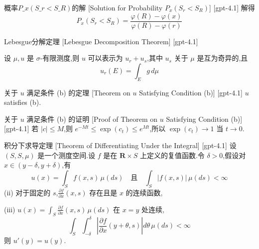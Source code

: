 \documentclass[UTF8]{ctexart}
\begin{document}
    
    
    \begin{ppt}
        {概率$P\_{x}(S\_{r} < S\_{R})$的解}
        [Solution for Probability $P_{x}(S_{r} < S_{R})$]
        [gpt-4.1]
        解得
\[
P_{x}(S_{r} < S_{R}) = \frac{\varphi(R) - \varphi(x)}{\varphi(R) - \varphi(r)}
\]

    \end{ppt}
    
    
    
    \begin{thm}
        {Lebesgue分解定理}
        [Lebesgue Decomposition Theorem]
        [gpt-4.1]
        
设 $\mu, 
u$ 是 $\sigma$-有限测度,则 $
u$ 可以表示为 $
u_{r} + 
u_{s}$,其中 $
u_{s}$ 关于 $\mu$ 是互为奇异的,且
\[
u_{r}(E) = \int_{E} g \, d\mu
\]

    \end{thm}
    
    
    
    \begin{thm}
        {关于 $
    u$ 满足条件 (b) 的定理}
        [Theorem on $
    u$ Satisfying Condition (b)]
        [gpt-4.1]
        $
u$ satisfies (b).
    \end{thm}
    
    
    
    \begin{prf}
        {关于 $
    u$ 满足条件 (b) 的证明}
        [Proof of Theorem on $
    u$ Satisfying Condition (b)]
        [gpt-4.1]
        若 $| c | \leq M$,则 $e^{ - M t } \leq \exp ( c _ { t } ) \leq e^{ M t }$,所以 $\exp ( c _ { t } ) \to 1$ 当 $t \to 0$.
    \end{prf}
    
    
    
    \begin{thm}
        {积分下求导定理}
        [Theorem of Differentiating Under the Integral]
        [gpt-4.1]
        设 $(S, S, \mu)$ 是一个测度空间.设 $f$ 是在 $\mathbf{R} \times S$ 上定义的复值函数.令 $\delta > 0$,假设对 $x \in (y - \delta, y + \delta)$,有
\[
u(x) = \int_{S} f(x, s)\, \mu(ds) \quad \text{且} \quad \int_{S} |f(x, s)|\, \mu(ds) < \infty
\]
(ii) 对于固定的 $s$,$\frac{\partial f}{\partial x}(x, s)$ 存在且是 $x$ 的连续函数,

(iii) $
u(x) = \int_{S} \frac{\partial f}{\partial x}(x, s)\, \mu(ds)$ 在 $x = y$ 处连续,
\[
\int_{S} \int_{-\delta}^{\delta} \left| \frac{\partial f}{\partial x}(y + \theta, s) \right| d\theta\, \mu(ds) < \infty
\]
则 $u'(y) = 
u(y)$.

    \end{thm}
    
\end{document}
